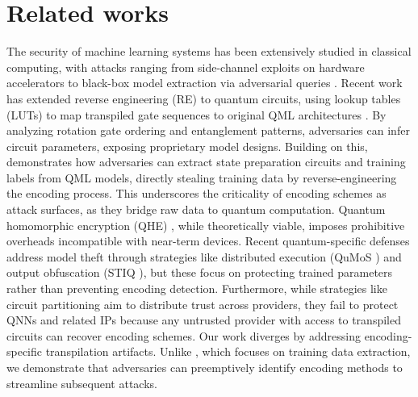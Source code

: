 \section{Related works}

The security of machine learning systems has been extensively studied in classical computing, with attacks ranging from side-channel exploits on hardware accelerators to black-box model extraction via adversarial queries \cite{hua2018reverse}\cite{oh2019towards}. Recent work has extended reverse engineering (RE) to quantum circuits, using lookup tables (LUTs) to map transpiled gate sequences to original QML architectures \cite{ghosh2024quantum}. By analyzing rotation gate ordering and entanglement patterns, adversaries can infer circuit parameters, exposing proprietary model designs. Building on this, \cite{upadhyay2024quantumdatabreachreusing} demonstrates how adversaries can extract state preparation circuits and training labels from QML models, directly stealing training data by reverse-engineering the encoding process. This underscores the criticality of encoding schemes as attack surfaces, as they bridge raw data to quantum computation. Quantum homomorphic encryption (QHE) \cite{fisher2014quantum}, while theoretically viable, imposes prohibitive overheads incompatible with near-term devices. Recent quantum-specific defenses address model theft through strategies like distributed execution (QuMoS \cite{wang2023qumos}) and output obfuscation (STIQ \cite{kundu2024stiq}), but these focus on protecting trained parameters rather than preventing encoding detection. Furthermore, while strategies like circuit partitioning \cite{upadhyay2022robust,upadhyay2023trustworthy} aim to distribute trust across providers, they fail to protect QNNs and related IPs because any untrusted provider with access to transpiled circuits can recover encoding schemes. Our work diverges by addressing encoding-specific transpilation artifacts. Unlike \cite{upadhyay2024quantumdatabreachreusing}, which focuses on training data extraction, we demonstrate that adversaries can preemptively identify encoding methods to streamline subsequent attacks.